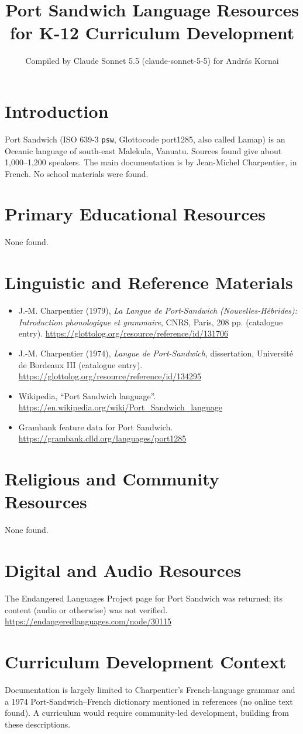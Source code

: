 \documentclass[12pt]{article}
\title{Port Sandwich Language Resources for K-12 Curriculum Development}
\author{Compiled by Claude Sonnet 5.5 (claude-sonnet-5-5) for Andr\'as Kornai}
\date{}
\begin{document}
\maketitle

\section{Introduction}
Port Sandwich (ISO 639-3 \texttt{psw}, Glottocode port1285, also called Lamap) is an Oceanic language of south-east Malekula, Vanuatu. Sources found give about 1{,}000--1{,}200 speakers. The main documentation is by Jean-Michel Charpentier, in French. No school materials were found.

\section{Primary Educational Resources}
None found.

\section{Linguistic and Reference Materials}
\begin{itemize}
\item J.-M. Charpentier (1979), \emph{La Langue de Port-Sandwich (Nouvelles-H\'ebrides): Introduction phonologique et grammaire}, CNRS, Paris, 208 pp. (catalogue entry). \url{https://glottolog.org/resource/reference/id/131706}
\item J.-M. Charpentier (1974), \emph{Langue de Port-Sandwich}, dissertation, Universit\'e de Bordeaux III (catalogue entry). \url{https://glottolog.org/resource/reference/id/134295}
\item Wikipedia, ``Port Sandwich language''. \url{https://en.wikipedia.org/wiki/Port_Sandwich_language}
\item Grambank feature data for Port Sandwich. \url{https://grambank.clld.org/languages/port1285}
\end{itemize}

\section{Religious and Community Resources}
None found.

\section{Digital and Audio Resources}
The Endangered Languages Project page for Port Sandwich was returned; its content (audio or otherwise) was not verified. \url{https://endangeredlanguages.com/node/30115}

\section{Curriculum Development Context}
Documentation is largely limited to Charpentier's French-language grammar and a 1974 Port-Sandwich--French dictionary mentioned in references (no online text found). A curriculum would require community-led development, building from these descriptions.
\end{document}
